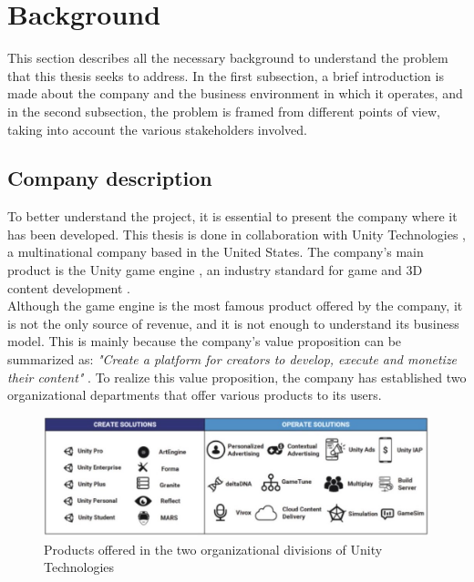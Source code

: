 \documentclass[english, 12pt, a4paper, sci, utf8, a-1b, online]{aaltothesis}
\begin{document}
\clearpage
\section{Background}
\label{sec:background}


This section describes all the necessary background to understand the problem that this thesis seeks to address. In the first subsection, a brief introduction is made about the company and the business environment in which it operates, and in the second subsection, the problem is framed from different points of view, taking into account the various stakeholders involved.

\subsection{Company description}


To better understand the project, it is essential to present the company where it has been developed. This thesis is done in collaboration with Unity Technologies \cite{UnityTechnologies}, a multinational company based in the United States. The company's main product is the Unity game engine \cite{haas2014history}, an industry standard for game and 3D content development  \cite{nicoll2019unity}.\\

Although the game engine is the most famous product offered by the company, it is not the only source of revenue, and it is not enough to understand its business model. This is mainly because the company's value proposition can be summarized as: \textit{"Create a platform for creators to develop, execute and monetize their content"} \cite{UnityBusinessModel}. To realize this value proposition, the company has established two organizational departments that offer various products to its users.\\

\begin{figure}[h]
    \centering
    \includegraphics[scale=0.3]{src/thesis/img/background/unity-division.jpg}
    \caption{Products offered in the two organizational divisions of Unity Technologies}
    \label{fig:unity-solutions}
\end{figure}
\end{document}
